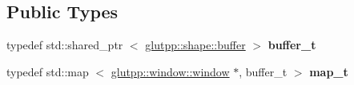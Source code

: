 \subsection*{\-Public \-Types}
\begin{DoxyCompactItemize}
\item 
\hypertarget{classglutpp_1_1shape_1_1shape_a571f41fec25897cb9cf4935692aa141d}{typedef std\-::shared\-\_\-ptr\*
$<$ \hyperlink{classglutpp_1_1shape_1_1buffer}{glutpp\-::shape\-::buffer} $>$ {\bfseries buffer\-\_\-t}}\label{classglutpp_1_1shape_1_1shape_a571f41fec25897cb9cf4935692aa141d}

\item 
\hypertarget{classglutpp_1_1shape_1_1shape_af5023860ac048fbca618dbf193df2209}{typedef std\-::map\*
$<$ \hyperlink{classglutpp_1_1window_1_1window}{glutpp\-::window\-::window} \*
$\ast$, buffer\-\_\-t $>$ {\bfseries map\-\_\-t}}\label{classglutpp_1_1shape_1_1shape_af5023860ac048fbca618dbf193df2209}

\end{DoxyCompactItemize}
